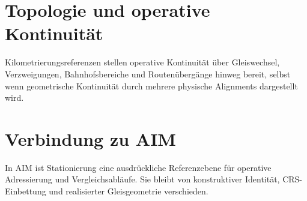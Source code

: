 \section{Topologie und operative Kontinuität}
Kilometrierungsreferenzen stellen operative Kontinuität über Gleiswechsel,
Verzweigungen, Bahnhofsbereiche und Routenübergänge hinweg bereit, selbst wenn
geometrische Kontinuität durch mehrere physische Alignments dargestellt wird.

\section{Verbindung zu AIM}
\begin{summary}
In AIM ist Stationierung eine ausdrückliche Referenzebene für operative
Adressierung und Vergleichsabläufe. Sie bleibt von konstruktiver Identität,
CRS-Einbettung und realisierter Gleisgeometrie verschieden.
\end{summary}
